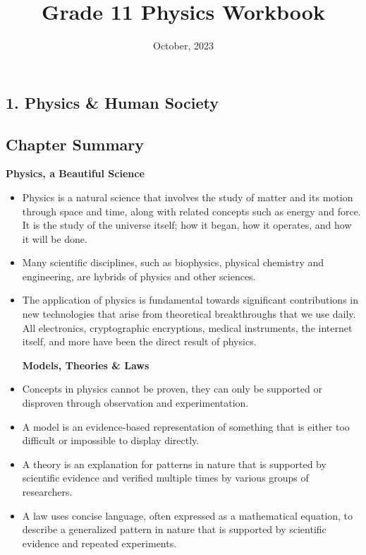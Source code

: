 \documentclass[12pt,addpoints]{exam}
\date{October, 2023}
\begin{document}
	\title{Grade 11 Physics Workbook}
	\maketitle
	
	\begin{center}
		\section*{1. Physics \& Human Society}
		\subsection*{Chapter Summary}
		\textbf{Physics, a Beautiful Science} 
	\end{center}
	
	\begin{itemize}
		\item Physics is a natural science that involves the study of matter and its motion through space and time, along with related concepts such as energy and force. It is the study of the universe itself; how it began, how it operates, and how it will be done.
		\item Many scientific disciplines, such as biophysics, physical chemistry and engineering, are hybrids of physics and other sciences.
		\item The application of physics is fundamental towards significant contributions in new technologies that arise from theoretical breakthroughs that we use daily. All electronics, cryptographic encryptions, medical instruments, the internet itself, and more have been the direct result of physics.
		\begin{center}
			\textbf{Models, Theories \& Laws} 
		\end{center}
		\item Concepts in physics cannot be proven, they can only be supported or disproven through observation and experimentation. 
		\item A model is an evidence-based representation of something that is either too difficult or impossible to display directly.
		\item A theory is an explanation for patterns in nature that is supported by scientific evidence and verified multiple times by various groups of researchers.
		\item A law uses concise language, often expressed as a mathematical equation, to describe a generalized pattern in nature that is supported by scientific evidence and repeated experiments.

\end{itemize}
\end{document}
